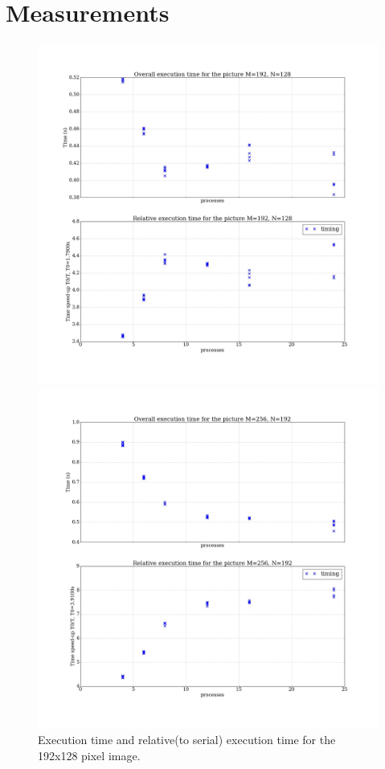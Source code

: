 \documentclass[11pt]{article}
\begin{document}
	\section{Measurements}
	\begin{figure}[H]	
		\centering
		\begin{minipage}[b]{.5\textwidth}
			\centering
			\includegraphics[width=\linewidth]{exec_192x128.jpeg}
			\caption{Execution time and relative(to serial) execution time for the 192x128 pixel image.}\label{exec_1}
		\end{minipage}%
		\begin{minipage}[b]{.5\textwidth}
			\centering
			\includegraphics[width=\linewidth]{exec_256x192.jpeg}

\end{minipage}
\end{figure}
\end{document}
